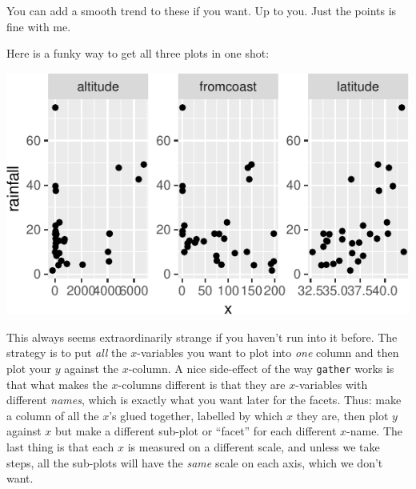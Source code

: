 \documentclass[]{tufte-book}
\newenvironment{Shaded}{}{}
\newcommand{\DataTypeTok}[1]{\textcolor[rgb]{0.56,0.13,0.00}{#1}}
\newcommand{\KeywordTok}[1]{\textcolor[rgb]{0.00,0.44,0.13}{\textbf{#1}}}
\newcommand{\NormalTok}[1]{#1}
\newcommand{\OperatorTok}[1]{\textcolor[rgb]{0.40,0.40,0.40}{#1}}
\newcommand{\StringTok}[1]{\textcolor[rgb]{0.25,0.44,0.63}{#1}}
\theoremstyle{definition}
\theoremstyle{definition}
\theoremstyle{definition}
\theoremstyle{remark}
\begin{document}
You can add a smooth trend to these if you want. Up to you. Just the
points is fine with me.

Here is a funky way to get all three plots in one shot:

\begin{Shaded}
\end{Shaded}

\includegraphics{12-regression_files/figure-latex/unnamed-chunk-11-1}

This always seems extraordinarily strange if you haven't run into it
before. The strategy is to put \emph{all} the \(x\)-variables you want
to plot into \emph{one} column and then plot your \(y\) against the
\(x\)-column. A nice side-effect of the way \texttt{gather} works is
that what makes the \(x\)-columns different is that they are
\(x\)-variables with different \emph{names}, which is exactly what you
want later for the facets. Thus: make a column of all the \(x\)'s glued
together, labelled by which \(x\) they are, then plot \(y\) against
\(x\) but make a different sub-plot or ``facet'' for each different
\(x\)-name. The last thing is that each \(x\) is measured on a different
scale, and unless we take steps, all the sub-plots will have the
\emph{same} scale on each axis, which we don't want.
\end{document}
